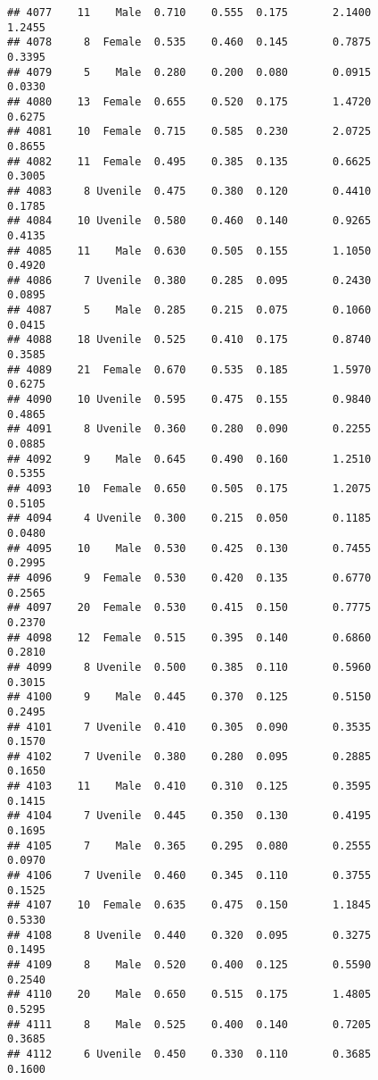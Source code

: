 \documentclass[
]{article}
\begin{document}
\begin{verbatim}
## 4077    11    Male  0.710    0.555  0.175       2.1400         1.2455
## 4078     8  Female  0.535    0.460  0.145       0.7875         0.3395
## 4079     5    Male  0.280    0.200  0.080       0.0915         0.0330
## 4080    13  Female  0.655    0.520  0.175       1.4720         0.6275
## 4081    10  Female  0.715    0.585  0.230       2.0725         0.8655
## 4082    11  Female  0.495    0.385  0.135       0.6625         0.3005
## 4083     8 Uvenile  0.475    0.380  0.120       0.4410         0.1785
## 4084    10 Uvenile  0.580    0.460  0.140       0.9265         0.4135
## 4085    11    Male  0.630    0.505  0.155       1.1050         0.4920
## 4086     7 Uvenile  0.380    0.285  0.095       0.2430         0.0895
## 4087     5    Male  0.285    0.215  0.075       0.1060         0.0415
## 4088    18 Uvenile  0.525    0.410  0.175       0.8740         0.3585
## 4089    21  Female  0.670    0.535  0.185       1.5970         0.6275
## 4090    10 Uvenile  0.595    0.475  0.155       0.9840         0.4865
## 4091     8 Uvenile  0.360    0.280  0.090       0.2255         0.0885
## 4092     9    Male  0.645    0.490  0.160       1.2510         0.5355
## 4093    10  Female  0.650    0.505  0.175       1.2075         0.5105
## 4094     4 Uvenile  0.300    0.215  0.050       0.1185         0.0480
## 4095    10    Male  0.530    0.425  0.130       0.7455         0.2995
## 4096     9  Female  0.530    0.420  0.135       0.6770         0.2565
## 4097    20  Female  0.530    0.415  0.150       0.7775         0.2370
## 4098    12  Female  0.515    0.395  0.140       0.6860         0.2810
## 4099     8 Uvenile  0.500    0.385  0.110       0.5960         0.3015
## 4100     9    Male  0.445    0.370  0.125       0.5150         0.2495
## 4101     7 Uvenile  0.410    0.305  0.090       0.3535         0.1570
## 4102     7 Uvenile  0.380    0.280  0.095       0.2885         0.1650
## 4103    11    Male  0.410    0.310  0.125       0.3595         0.1415
## 4104     7 Uvenile  0.445    0.350  0.130       0.4195         0.1695
## 4105     7    Male  0.365    0.295  0.080       0.2555         0.0970
## 4106     7 Uvenile  0.460    0.345  0.110       0.3755         0.1525
## 4107    10  Female  0.635    0.475  0.150       1.1845         0.5330
## 4108     8 Uvenile  0.440    0.320  0.095       0.3275         0.1495
## 4109     8    Male  0.520    0.400  0.125       0.5590         0.2540
## 4110    20    Male  0.650    0.515  0.175       1.4805         0.5295
## 4111     8    Male  0.525    0.400  0.140       0.7205         0.3685
## 4112     6 Uvenile  0.450    0.330  0.110       0.3685         0.1600

\end{verbatim}
\end{document}
